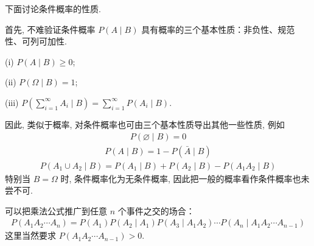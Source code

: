 \documentclass[../../main.tex]{subfiles}
\begin{document}
下面讨论条件概率的性质.

首先, 不难验证条件概率 $P(A\mid B)$ 具有概率的三个基本性质：非负性、规范性、可列可加性.

(i) $P(A\mid B)\geqslant 0$;

(ii) $P(\Omega\mid B)=1$;

(iii) $P\left(\sum_{i=1}^{\infty} A_i\mid B\right)=\sum_{i=1}^{\infty} P(A_i\mid B)$.

因此, 类似于概率, 对条件概率也可由三个基本性质导出其他一些性质, 例如
\begin{align*}
P(\varnothing\mid B)=0
\end{align*}
\begin{align*}
P(A\mid B)=1-P(\bar{A}\mid B)
\end{align*}
\begin{align*}
P(A_1\cup A_2\mid B)=P(A_1\mid B)+P(A_2\mid B)-P(A_1A_2\mid B)
\end{align*}
特别当 $B=\Omega$ 时, 条件概率化为无条件概率, 因此把一般的概率看作条件概率也未尝不可.

\begin{remark}[推广的乘法公式]\label{remark:ch02-推广乘法公式}
可以把乘法公式推广到任意 $n$ 个事件之交的场合：
\begin{align}\label{align:ch02-推广乘法公式}
P(A_1A_2\cdots A_n)=P(A_1)P(A_2\mid A_1)P(A_3\mid A_1A_2)\cdots P(A_n\mid A_1A_2\cdots A_{n-1})
\end{align}
这里当然要求 $P(A_1A_2\cdots A_{n-1})>0$.
\end{remark}
\end{document}
